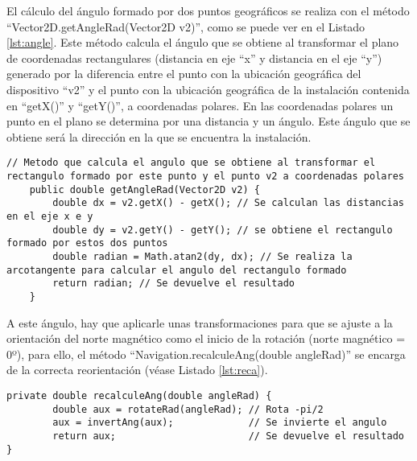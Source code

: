 El cálculo del ángulo formado por dos puntos geográficos se realiza con el método ``Vector2D.getAngleRad(Vector2D v2)'', como se puede ver en el Listado \ref{lst:angle}. Este método calcula el ángulo que se obtiene al transformar el plano de coordenadas rectangulares (distancia en eje ``x'' y distancia en el eje ``y'') generado por la diferencia entre el punto con la ubicación geográfica del dispositivo ``v2'' y el punto con la ubicación geográfica de la instalación contenida en ``getX()'' y ``getY()'', a coordenadas polares. En las coordenadas polares un punto en el plano se determina por una distancia y un ángulo. Este ángulo que se obtiene será la dirección en la que se encuentra la instalación.


\begin{lstlisting}[caption={Método que calcula el ángulo formado por dos puntos.}, label={lst:angle}]
    // Metodo que calcula el angulo que se obtiene al transformar el rectangulo formado por este punto y el punto v2 a coordenadas polares
    public double getAngleRad(Vector2D v2) {
        double dx = v2.getX() - getX(); // Se calculan las distancias en el eje x e y
        double dy = v2.getY() - getY(); // se obtiene el rectangulo formado por estos dos puntos
        double radian = Math.atan2(dy, dx); // Se realiza la arcotangente para calcular el angulo del rectangulo formado
        return radian; // Se devuelve el resultado
    }
\end{lstlisting}

A este ángulo, hay que aplicarle unas transformaciones para que se ajuste a la orientación del norte magnético como el inicio de la rotación (norte magnético = 0º), para ello, el método ``Navigation.recalculeAng(double angleRad)'' se encarga de la correcta reorientación (véase Listado \ref{lst:reca}). 

\begin{lstlisting}[caption={Método que recalcula en ángulo para orientarlo en función del norte magnético.}, label={lst:reca}]
    private double recalculeAng(double angleRad) {
        double aux = rotateRad(angleRad); // Rota -pi/2
        aux = invertAng(aux);             // Se invierte el angulo 
        return aux;                       // Se devuelve el resultado
}   
\end{lstlisting}

